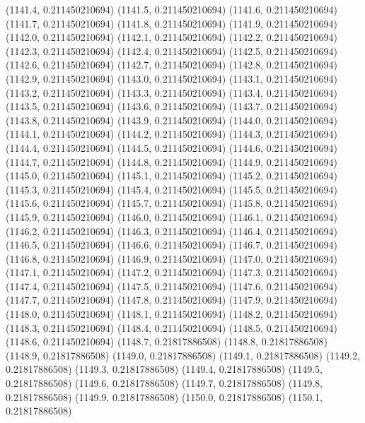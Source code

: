 {					(1141.4, 0.211450210694)
					(1141.5, 0.211450210694)
					(1141.6, 0.211450210694)
					(1141.7, 0.211450210694)
					(1141.8, 0.211450210694)
					(1141.9, 0.211450210694)
					(1142.0, 0.211450210694)
					(1142.1, 0.211450210694)
					(1142.2, 0.211450210694)
					(1142.3, 0.211450210694)
					(1142.4, 0.211450210694)
					(1142.5, 0.211450210694)
					(1142.6, 0.211450210694)
					(1142.7, 0.211450210694)
					(1142.8, 0.211450210694)
					(1142.9, 0.211450210694)
					(1143.0, 0.211450210694)
					(1143.1, 0.211450210694)
					(1143.2, 0.211450210694)
					(1143.3, 0.211450210694)
					(1143.4, 0.211450210694)
					(1143.5, 0.211450210694)
					(1143.6, 0.211450210694)
					(1143.7, 0.211450210694)
					(1143.8, 0.211450210694)
					(1143.9, 0.211450210694)
					(1144.0, 0.211450210694)
					(1144.1, 0.211450210694)
					(1144.2, 0.211450210694)
					(1144.3, 0.211450210694)
					(1144.4, 0.211450210694)
					(1144.5, 0.211450210694)
					(1144.6, 0.211450210694)
					(1144.7, 0.211450210694)
					(1144.8, 0.211450210694)
					(1144.9, 0.211450210694)
					(1145.0, 0.211450210694)
					(1145.1, 0.211450210694)
					(1145.2, 0.211450210694)
					(1145.3, 0.211450210694)
					(1145.4, 0.211450210694)
					(1145.5, 0.211450210694)
					(1145.6, 0.211450210694)
					(1145.7, 0.211450210694)
					(1145.8, 0.211450210694)
					(1145.9, 0.211450210694)
					(1146.0, 0.211450210694)
					(1146.1, 0.211450210694)
					(1146.2, 0.211450210694)
					(1146.3, 0.211450210694)
					(1146.4, 0.211450210694)
					(1146.5, 0.211450210694)
					(1146.6, 0.211450210694)
					(1146.7, 0.211450210694)
					(1146.8, 0.211450210694)
					(1146.9, 0.211450210694)
					(1147.0, 0.211450210694)
					(1147.1, 0.211450210694)
					(1147.2, 0.211450210694)
					(1147.3, 0.211450210694)
					(1147.4, 0.211450210694)
					(1147.5, 0.211450210694)
					(1147.6, 0.211450210694)
					(1147.7, 0.211450210694)
					(1147.8, 0.211450210694)
					(1147.9, 0.211450210694)
					(1148.0, 0.211450210694)
					(1148.1, 0.211450210694)
					(1148.2, 0.211450210694)
					(1148.3, 0.211450210694)
					(1148.4, 0.211450210694)
					(1148.5, 0.211450210694)
					(1148.6, 0.211450210694)
					(1148.7, 0.21817886508)
					(1148.8, 0.21817886508)
					(1148.9, 0.21817886508)
					(1149.0, 0.21817886508)
					(1149.1, 0.21817886508)
					(1149.2, 0.21817886508)
					(1149.3, 0.21817886508)
					(1149.4, 0.21817886508)
					(1149.5, 0.21817886508)
					(1149.6, 0.21817886508)
					(1149.7, 0.21817886508)
					(1149.8, 0.21817886508)
					(1149.9, 0.21817886508)
					(1150.0, 0.21817886508)
					(1150.1, 0.21817886508)
}
